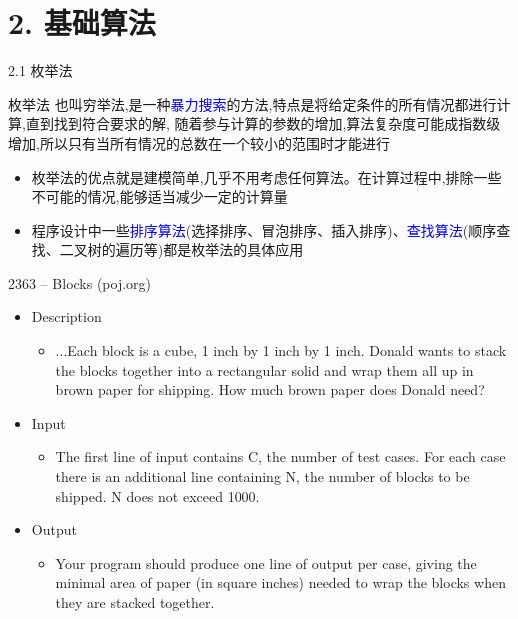 


\frame{\titlepage}
\section{2. 基础算法}
\begin{frame}{2.1 枚举法}
    \begin{block}{枚举法}
        也叫穷举法,是一种\textcolor{blue}{暴力搜索}的方法,特点是将给定条件的所有情况都进行计算,直到找到符合要求的解, 随着参与计算的参数的增加,算法复杂度可能成指数级增加,所以只有当所有情况的总数在一个较小的范围时才能进行
    \end{block}
    \vfill
    \begin{itemize}
        \item 枚举法的优点就是建模简单,几乎不用考虑任何算法。在计算过程中,排除一些不可能的情况,能够适当减少一定的计算量
        \item 程序设计中一些\textcolor{blue}{排序算法}(选择排序、冒泡排序、插入排序)、\textcolor{blue}{查找算法}(顺序查找、二叉树的遍历等)都是枚举法的具体应用
    \end{itemize}
\end{frame}
\begin{frame}{2363 -- Blocks (poj.org)}
    \begin{itemize}
        \item Description
        \begin{itemize}
            \item ...Each block is a cube, 1 inch by 1 inch by 1 inch. Donald wants to stack the blocks together into a rectangular solid and wrap them all up in brown paper for shipping. How much brown paper does Donald need?
        \end{itemize}
        \item Input
        \begin{itemize}
            \item The first line of input contains C, the number of test cases. For each case there is an additional line containing N, the number of blocks to be shipped. N does not exceed 1000.
        \end{itemize}
        \item Output
        \begin{itemize}
            \item Your program should produce one line of output per case, giving the minimal area of paper (in square inches) needed to wrap the blocks when they are stacked together.
        \end{itemize}
    \end{itemize}
\end{frame}
